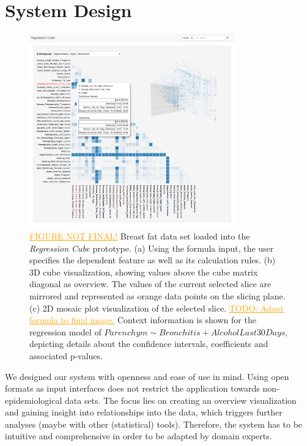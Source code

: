 \documentclass[journal]{style/vgtc} 			          %
\newcommand{\com}[1]{\textcolor{orange}{\uline{#1}}}
\begin{document}
\section{System Design} \label{sec:SystemDesign}
\begin{figure}[htb]
 \centering
 \includegraphics[width=3.5in]{figures/system_sketch}
 \caption{
 \com{FIGURE NOT FINAL!}
 Breast fat data set loaded into the \emph{Regression Cube} prototype.
 (a) Using the formula input, the user specifies the dependent feature as well as its calculation rules.
 (b) 3D cube visualization, showing values above the cube matrix diagonal as overview.
 The values of the current selected slice are mirrored and represented as orange data points on the slicing plane.
 (c) 2D mosaic plot visualization of the selected slice.
 \com{TODO: Adapt formula to final image.}
 Context information is shown for the regression model of $Parenchym \sim Bronchitis + AlcoholLast30Days$, depicting details about the confidence intervals, coefficients and associated p-values.
 }
  \label{fig:System}
\end{figure}
We designed our system with openness and ease of use in mind.
Using open formats as input interfaces does not restrict the application towards non-epidemiological data sets.
The focus lies on creating an overview visualization and gaining insight into relationships into the data, which triggers further analyses (maybe with other (statistical) tools).
Therefore, the system has to be intuitive and comprehensive in order to be adapted by domain experts.
\\\\
\end{document}
